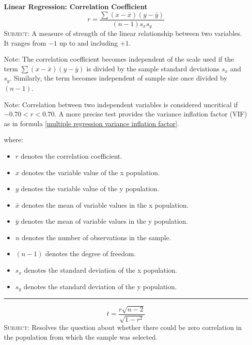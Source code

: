 \documentclass[	DIV=calc,%
							paper=a4,%
							fontsize=11pt,%
							twocolumn]{scrartcl} %
\newcommand{\hformbar}[1]{\vspace{5pt}\hrule\vspace{10pt}} %
\newcommand{\formdesc}[1]{\noindent\textbf{#1}}
\begin{document}
\newpage
\cleardoublepage


\formdesc{Linear Regression: Correlation Coefficient}
\begin{equation}
\label{correlation coefficient}
r = \frac{\sum(x-\bar{x})(y-\bar{y})}{(n-1)s_{x}s_{y}}
\end{equation}
\textsc{Subject:} A measure of strength of the linear relationship between two variables. It ranges from $-1$ up to and including $+1$.

\textrm{Note:} The correlation coefficient becomes independent of the scale used if the term $\sum(x-\bar{x})(y-\bar{y})$ is divided by the sample standard deviations $s_{x}$ and $s_{y}$. Similarly, the term becomes independent of sample size once divided by $(n-1)$. 

\textrm{Note:} Correlation between two independent variables is considered uncritical if $-0.70 < r < 0.70$. A more precise test provides the variance inflation factor (VIF) as in formula \eqref{multiple regression variance inflation factor}.

where:
\begin{itemize}
 \item $r$ denotes the correlation coefficient.
 \item $x$ denotes the variable value of the x population.
 \item $y$ denotes the variable value of the y population.
 \item $\bar{x}$ denotes the mean of variable values in the x population.
 \item $\bar{y}$ denotes the mean of variable values in the y population.
 \item $n$ denotes the number of observations in the sample.
 \item $(n-1)$ denotes the degree of freedom.
 \item $s_{x}$ denotes the standard deviation of the x population.
 \item $s_{y}$ denotes the standard deviation of the y population.
\end{itemize}
\hformbar


\formdesc{Linear Regression: t Test for the Correlation Coefficient $r$}
\begin{equation}
\label{correlation coefficient t test}
t = \frac{r\sqrt{n-2}}{\sqrt{1-r^2}}
\end{equation}
\textsc{Subject:} Resolves the question about whether there could be zero correlation in the population from which the sample was selected.
\end{document}
